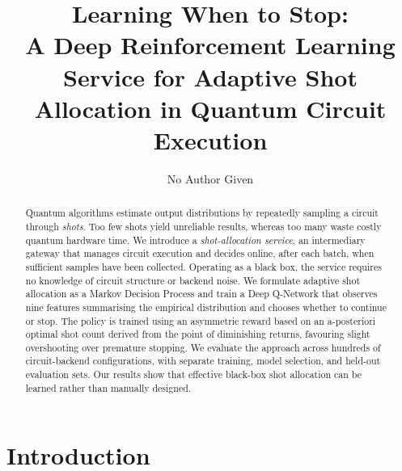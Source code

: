 \documentclass[runningheads]{llncs}
\begin{document}
\title{Learning When to Stop:\\
A Deep Reinforcement Learning Service for Adaptive Shot Allocation in Quantum Circuit Execution}

\author{No Author Given}


\maketitle

\begin{abstract}
Quantum algorithms estimate output distributions by repeatedly sampling a circuit through \emph{shots}. Too few shots yield unreliable results, whereas too many waste costly quantum hardware time. We introduce a \emph{shot-allocation service}, an intermediary gateway that manages circuit execution and decides online, after each batch, when sufficient samples have been collected. Operating as a black box, the service requires no knowledge of circuit structure or backend noise. We formulate adaptive shot allocation as a Markov Decision Process and train a Deep Q-Network that observes nine features summarising the empirical distribution and chooses whether to continue or stop. The policy is trained using an asymmetric reward based on an a-posteriori optimal shot count derived from the point of diminishing returns, favouring slight overshooting over premature stopping. We evaluate the approach across hundreds of circuit-backend configurations, with separate training, model selection, and held-out evaluation sets. 
Our results show that effective black-box shot allocation can be learned rather than manually designed.

\end{abstract}

\section{Introduction}
\label{sec:intro}
\end{document}
